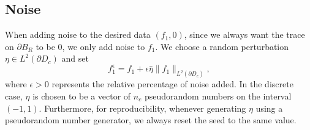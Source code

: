 \documentclass[11pt]{amsart}
\theoremstyle{definition}
\theoremstyle{definition}
\theoremstyle{definition}
\begin{document}
\subsection{Noise}
When adding noise to the desired data $(f_{1}, 0)$, since we always want the trace on $\partial B_{R}$ to be $0$, we only add noise to $f_{1}$. We choose a random perturbation $\eta \in L^{2}(\partial D_{c})$ and set
\begin{equation}
f_{1}^{\epsilon} = f_{1} + \epsilon \widehat{\eta} \|f_{1}\|_{L^{2}(\partial D_{c})}, \label{eq:noiseterm}
\end{equation}
where $\epsilon > 0$ represents the relative percentage of noise added. In the discrete case, $\eta$ is chosen to be a vector of $n_{c}$ pseudorandom numbers on the interval $(-1,1)$. Furthermore, for reproducibility, whenever generating $\eta$ using a pseudorandom number generator, we always reset the seed to the same value.
\end{document}
